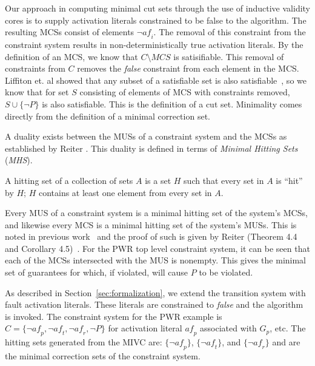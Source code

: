 Our approach in computing minimal cut sets through the use of inductive validity cores is to supply activation literals constrained to be false to the algorithm. The resulting MCSs consist of elements $\neg \mathit{af}_i$. The removal of this constraint from the constraint system results in non-deterministically true activation literals. By the definition of an MCS, we know that $C \setminus \mathit{MCS}$ is satisifiable. This removal of constraints from $C$ removes the {\em false} constraint from each element in the MCS. Liffiton et. al showed that any subset of a satisfiable set is also satisfiable~\cite{liffiton2016fast}, so we know that for set $S$ consisting of elements of MCS with constraints removed, $S \cup \{\neg P\}$ is also satisfiable. This is the definition of a cut set. Minimality comes directly from the definition of a minimal correction set. 

A duality exists between the MUSs of a constraint system and the MCSs as established by Reiter \cite{reiter1987theory}. This duality is defined in terms of \textit{Minimal Hitting Sets} (\textit{MHS}). 
\begin{definition}
A hitting set of a collection of sets $A$ is a set $H$ such that every set in $A$ is ``hit'' by $H$; $H$ contains at least one element from every set in $A$. 
\end{definition}
Every MUS of a constraint system is a minimal hitting set of the system's MCSs, and likewise every MCS is a minimal hitting set of the system's MUSs. This is noted in previous work~\cite{liffiton2016fast, de1987diagnosing} and the proof of such is given by Reiter (Theorem 4.4 and Corollary 4.5)~\cite{reiter1987theory}. For the PWR top level constraint system, it can be seen that each of the MCSs intersected with the MUS is nonempty. This gives the minimal set of guarantees for which, if violated, will cause $P$ to be violated. 

As described in Section~\ref{sec:formalization}, we extend the transition system with fault activation literals. These literals are constrained to {\em false} and the \aivcalg algorithm is invoked. The constraint system for the PWR example is $C = \{\neg\mathit{af}_p, \neg\mathit{af}_t, \neg\mathit{af}_r, \neg P\}$ for activation literal $\mathit{af}_p$ associated with $G_p$, etc. The hitting sets generated from the MIVC are: $\{\neg\mathit{af}_p\}$, $\{\neg\mathit{af}_t\}$, and $\{\neg\mathit{af}_r\}$ and are the minimal correction sets of the constraint system. 
